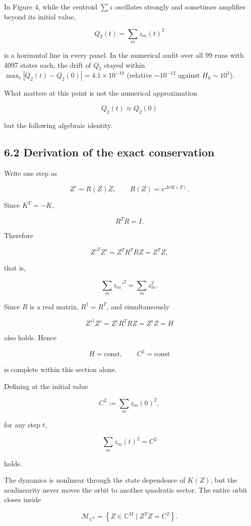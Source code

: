 \documentclass[
  a4paper,
]{article}
\begin{document}
In Figure 4, while the centroid \(\sum z\) oscillates strongly and
sometimes amplifies beyond its initial value,

\[
Q_2(t)=\sum_m z_m(t)^2
\]

is a horizontal line in every panel. In the numerical audit over all 99
runs with 4097 states each, the drift of \(Q_2\) stayed within
\(\max_t|Q_2(t)-Q_2(0)|=4.1\times10^{-10}\) (relative \(\sim10^{-12}\)
against \(H_0\sim10^3\)).

What matters at this point is not the numerical approximation

\[
Q_2(t)\approx Q_2(0)
\]

but the following algebraic identity.

\subsection{6.2 Derivation of the exact
conservation}\label{derivation-of-the-exact-conservation}

Write one step as

\[
Z'=R(Z)Z,
\qquad
R(Z)=e^{\Delta\tau K(Z)}.
\]

Since \(K^T=-K\),

\[
R^TR=I.
\]

Therefore

\[
Z'^T Z'
=
Z^T R^T R Z
=
Z^T Z,
\]

that is,

\[
\boxed{
\sum_m z_m'^2
=
\sum_m z_m^2
}.
\]

Since \(R\) is a real matrix, \(R^\dagger=R^T\), and simultaneously

\[
\boxed{
Z'^\dagger Z'
=
Z^\dagger R^TRZ
=
Z^\dagger Z
=
H
}
\]

also holds. Hence

\[
\boxed{H=\text{const},\qquad C^2=\text{const}}
\]

is complete within this section alone.

Defining at the initial value

\[
C^2:=\sum_m z_m(0)^2,
\]

for any step \(t\),

\[
\boxed{
\sum_m z_m(t)^2=C^2
}
\]

holds.

The dynamics is nonlinear through the state dependence of \(K(Z)\), but
the nonlinearity never moves the orbit to another quadratic sector. The
entire orbit closes inside

\[
\mathcal M_{C^2}
=
\left\{
Z\in\mathbb C^M
\mid
Z^T Z=C^2
\right\}.
\]
\end{document}
